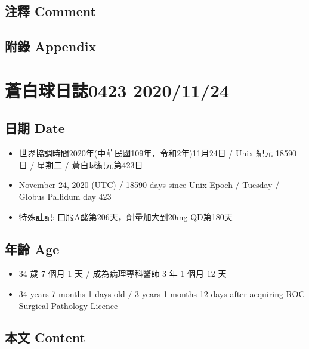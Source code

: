 \documentclass[
]{article}
\providecommand{\tightlist}{%
  \setlength{\itemsep}{0pt}\setlength{\parskip}{0pt}}
\begin{document}
\hypertarget{ux6ce8ux91cb-comment-16}{%
\subsection{注釋 Comment}\label{ux6ce8ux91cb-comment-16}}

\hypertarget{ux9644ux9304-appendix-16}{%
\subsection{附錄 Appendix}\label{ux9644ux9304-appendix-16}}

\hypertarget{ux84bcux767dux7403ux65e5ux8a8c0423-20201124}{%
\section{蒼白球日誌0423
2020/11/24}\label{ux84bcux767dux7403ux65e5ux8a8c0423-20201124}}

\hypertarget{ux65e5ux671f-date-17}{%
\subsection{日期 Date}\label{ux65e5ux671f-date-17}}

\begin{itemize}
\tightlist
\item
  世界協調時間2020年(中華民國109年，令和2年)11月24日 / Unix 紀元 18590
  日 / 星期二 / 蒼白球紀元第423日
\item
  November 24, 2020 (UTC) / 18590 days since Unix Epoch / Tuesday /
  Globus Pallidum day 423
\item
  特殊註記: 口服A酸第206天，劑量加大到20mg QD第180天
\end{itemize}

\hypertarget{ux5e74ux9f61-age-17}{%
\subsection{年齡 Age}\label{ux5e74ux9f61-age-17}}

\begin{itemize}
\tightlist
\item
  34 歲 7 個月 1 天 / 成為病理專科醫師 3 年 1 個月 12 天
\item
  34 years 7 months 1 days old / 3 years 1 months 12 days after
  acquiring ROC Surgical Pathology Licence
\end{itemize}

\hypertarget{ux672cux6587-content-17}{%
\subsection{本文 Content}\label{ux672cux6587-content-17}}
\end{document}
